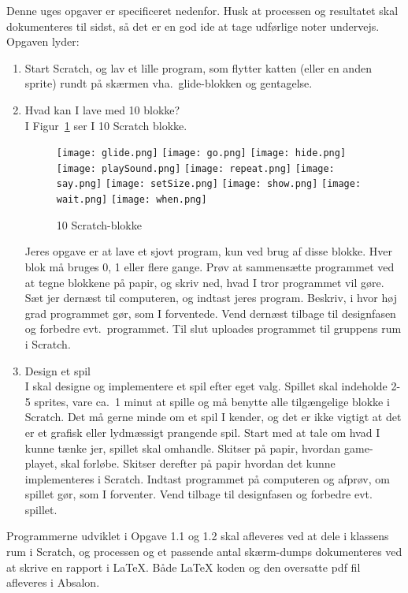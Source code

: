 \documentclass[a4paper,12pt]{article}
\begin{document}
Denne uges opgaver er specificeret nedenfor. Husk at processen og resultatet skal dokumenteres til sidst, så det er en god ide at tage udførlige noter undervejs. Opgaven lyder:
\begin{enumerate}[label=1g.\arabic*,start=0]
\item Start Scratch, og lav et lille program, som flytter katten (eller en anden sprite) rundt på skærmen vha.\ glide-blokken og gentagelse.
\item Hvad kan I lave med 10 blokke?\\
  I Figur~\ref{fig:blokke} ser I 10 Scratch blokke.
  \begin{figure}
    \centering
    \texttt{[image: glide.png]}
    \texttt{[image: go.png]}
    \texttt{[image: hide.png]}
    \texttt{[image: playSound.png]}
    \texttt{[image: repeat.png]}
    \texttt{[image: say.png]}
    \texttt{[image: setSize.png]}
    \texttt{[image: show.png]}
    \texttt{[image: wait.png]}
    \texttt{[image: when.png]}
    \caption{10 Scratch-blokke}
    \label{fig:blokke}
  \end{figure}
  Jeres opgave er at lave et sjovt program, kun ved brug af disse blokke. Hver blok må bruges 0, 1 eller flere gange. Prøv at sammensætte programmet ved at tegne blokkene på papir, og skriv ned, hvad I tror programmet vil gøre. Sæt jer dernæst til computeren, og indtast jeres program. Beskriv, i hvor høj grad programmet gør, som I forventede. Vend dernæst tilbage til designfasen og forbedre evt.\ programmet. Til slut uploades programmet til gruppens rum i Scratch.
\item Design et spil\\
  I skal designe og implementere et spil efter eget valg. Spillet skal indeholde 2-5 sprites, vare ca.\ 1 minut at spille og må benytte alle tilgængelige blokke i Scratch. Det må gerne minde om et spil I kender, og det er ikke vigtigt at det er et grafisk eller lydmæssigt prangende spil. Start med at tale om hvad I kunne tænke jer, spillet skal omhandle. Skitser på papir, hvordan game-playet, skal forløbe. Skitser derefter på papir hvordan det kunne implementeres i Scratch. Indtast programmet på computeren og afprøv, om spillet gør, som I forventer. Vend tilbage til designfasen og forbedre evt. spillet.
\end{enumerate}
Programmerne udviklet i Opgave 1.1 og 1.2 skal afleveres ved at dele i klassens rum i Scratch, og processen og et passende antal skærm-dumps dokumenteres ved at skrive en rapport i LaTeX. Både LaTeX koden og den oversatte pdf fil afleveres i Absalon.
\end{document}
